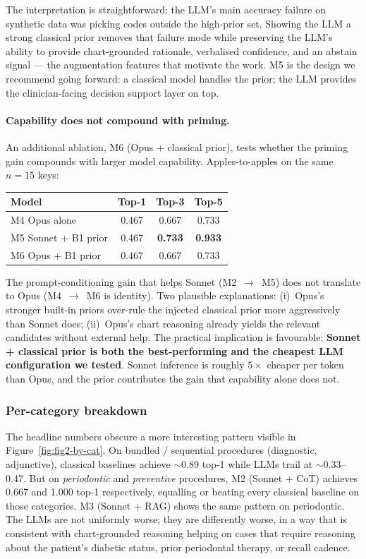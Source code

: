 \documentclass[preprint,authoryear,1p,12pt]{elsarticle}
\begin{document}
The interpretation is straightforward: the LLM's main accuracy failure
on synthetic data was picking codes outside the high-prior set. Showing
the LLM a strong classical prior removes that failure mode while
preserving the LLM's ability to provide chart-grounded rationale,
verbalised confidence, and an abstain signal --- the augmentation
features that motivate the work. M5 is the design we recommend going
forward: a classical model handles the prior; the LLM provides the
clinician-facing decision support layer on top.

\paragraph{Capability does not compound with priming.} An additional
ablation, M6 (Opus + classical prior), tests whether the priming gain
compounds with larger model capability. Apples-to-apples on the same
$n{=}15$ keys:

\begin{center}
\begin{tabular}{lccc}
\toprule
Model & Top-1 & Top-3 & Top-5 \\
\midrule
M4 Opus alone        & 0.467 & 0.667 & 0.733 \\
M5 Sonnet + B1 prior & 0.467 & \textbf{0.733} & \textbf{0.933} \\
M6 Opus + B1 prior   & 0.467 & 0.667 & 0.733 \\
\bottomrule
\end{tabular}
\end{center}

The prompt-conditioning gain that helps Sonnet (M2~$\to$~M5) does not
translate to Opus (M4~$\to$~M6 is identity). Two plausible
explanations: (i)~Opus's stronger built-in priors over-rule the
injected classical prior more aggressively than Sonnet does;
(ii)~Opus's chart reasoning already yields the relevant candidates
without external help. The practical implication is favourable:
\textbf{Sonnet + classical prior is both the best-performing and the
cheapest LLM configuration we tested}. Sonnet inference is roughly
$5\times$ cheaper per token than Opus, and the prior contributes the
gain that capability alone does not.

\subsubsection{Per-category breakdown}

The headline numbers obscure a more interesting pattern visible in
Figure~\ref{fig:fig2-by-cat}. On bundled / sequential procedures
(diagnostic, adjunctive), classical baselines achieve $\sim$0.89 top-1
while LLMs trail at $\sim$0.33--0.47. But on \emph{periodontic} and
\emph{preventive} procedures, M2 (Sonnet + CoT) achieves 0.667 and 1.000
top-1 respectively, equalling or beating every classical baseline on
those categories. M3 (Sonnet + RAG) shows the same pattern on
periodontic. The LLMs are not uniformly worse; they are differently
worse, in a way that is consistent with chart-grounded reasoning helping
on cases that require reasoning about the patient's diabetic status,
prior periodontal therapy, or recall cadence.
\end{document}
